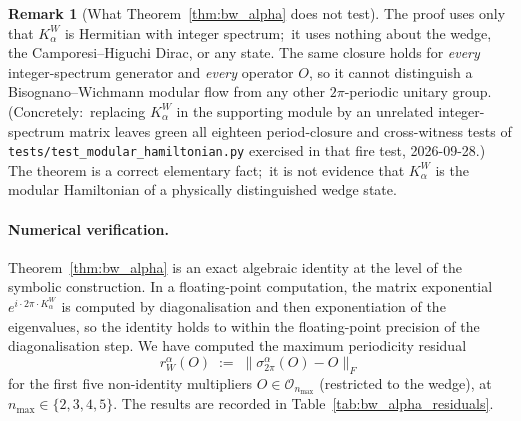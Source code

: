 \documentclass[11pt,a4paper]{article}
\theoremstyle{plain}
\theoremstyle{definition}
\newtheorem{remark}[theorem]{Remark}
\newcommand{\nmax}{n_{\max}}
\newcommand{\Op}{\mathcal{O}}
\newcommand{\Frob}[1]{\lVert #1 \rVert_{F}}
\begin{document}
\begin{remark}[What Theorem~\ref{thm:bw_alpha} does not test]
\label{rem:bw_alpha_automatic}
The proof uses only that $K_\alpha^W$ is Hermitian with integer
spectrum;\ it uses nothing about the wedge, the Camporesi--Higuchi
Dirac, or any state.  The same closure holds for \emph{every}
integer-spectrum generator and \emph{every} operator $O$, so it cannot
distinguish a Bisognano--Wichmann modular flow from any other
$2\pi$-periodic unitary group.  (Concretely:\ replacing $K_\alpha^W$ in
the supporting module by an unrelated integer-spectrum matrix leaves
green all eighteen period-closure and cross-witness tests of
\texttt{tests/test\_modular\_hamiltonian.py} exercised in that fire
test, 2026-09-28.)  The theorem is a correct elementary fact;\ it is not evidence
that $K_\alpha^W$ is the modular Hamiltonian of a physically
distinguished wedge state.
\end{remark}

\paragraph{Numerical verification.}
Theorem~\ref{thm:bw_alpha} is an exact algebraic identity at the level
of the symbolic construction. In a floating-point computation, the
matrix exponential $e^{i \cdot 2\pi \cdot K_\alpha^W}$ is computed by
diagonalisation and then exponentiation of the eigenvalues, so the
identity holds to within the floating-point precision of the
diagonalisation step. We have computed the maximum periodicity
residual
\begin{equation}\label{eq:periodicity_residual_def}
   r_W^{\alpha}(O) \;:=\; \Frob{\sigma_{2\pi}^{\alpha}(O) - O}
\end{equation}
for the first five non-identity multipliers $O \in \Op_{\nmax}$
(restricted to the wedge), at $\nmax \in \{2, 3, 4, 5\}$. The
results are recorded in Table~\ref{tab:bw_alpha_residuals}.
\end{document}
